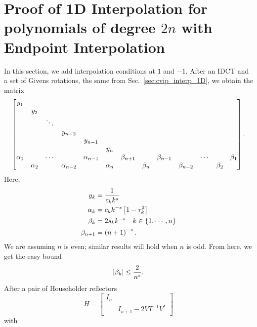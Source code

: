 \section{Proof of 1D Interpolation for polynomials of degree $2n$ with
    Endpoint Interpolation}
\label{sec:cvip_interp_1D_bdy}

In this section, we add interpolation conditions at $1$ and $-1$.
After an IDCT and a set of Givens rotations,
the same from Sec.~\ref{sec:cvip_interp_1D}, we obtain the matrix
%
\begin{equation}
    \setcounter{MaxMatrixCols}{20}
    \begin{bmatrix}
        y_{1} & \\
        & y_{2} & \\
        & & \ddots & \\
        & & & y_{n-2} \\
        & & & & y_{n-1} \\
        & & & & & y_{n} \\
        \alpha_{1} & & \cdots & & \alpha_{n-1} & & \beta_{n+1} & & \beta_{n-1}
            & & \cdots & & \beta_{1} \\
        & \alpha_{2} & & \alpha_{n-2} & & \alpha_{n} &
            & \beta_{n} & & \beta_{n-2} & & \beta_{2} \\
    \end{bmatrix}.
\end{equation}
%
Here,
%
\begin{align}
    y_{k} &= \frac{1}{c_{k}k^{s}} \nonumber\\
    \alpha_{k} &= c_{k}k^{-s} \left[ 1-\tau_{k}^{2} \right] \nonumber\\
    \beta_{k} &= 2s_{k}k^{-s} \quad k\in\left\{ 1,\cdots,n \right\} \nonumber\\
    \beta_{n+1} &= \left( n+1 \right)^{-s}.
\end{align}
%
We are assuming $n$ is even; similar results will hold when $n$ is odd.
From here, we get the easy bound
%
\begin{equation}
    \left| \beta_{k} \right| \le \frac{2}{n^{s}}.
\end{equation}
%
After a pair of Householder reflectors
%
\begin{equation}
    H = \begin{bmatrix} I_{n} & \\ & I_{n+1} - 2VT^{-1}V^{*} \end{bmatrix}
\end{equation}
%
with
%
